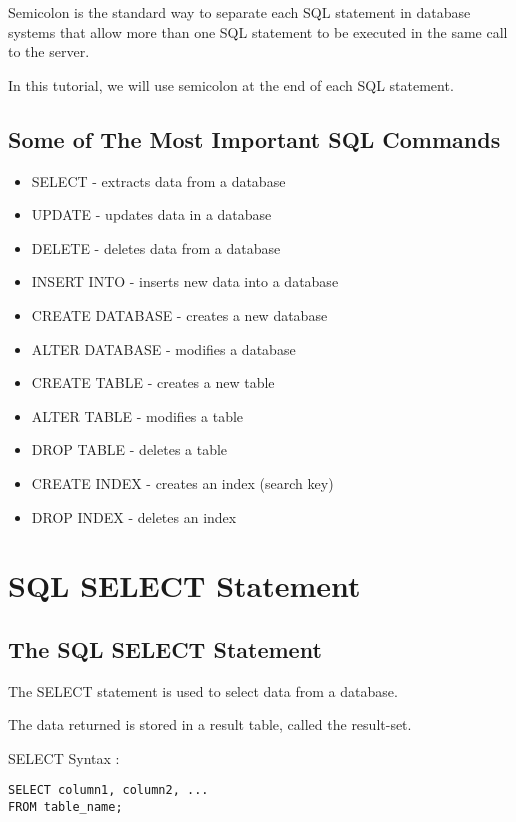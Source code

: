 \documentclass[a4paper,12pt]{article}
\begin{document}
Semicolon is the standard way to separate each SQL statement in database systems that allow more than one SQL statement to be executed in the same call to the server.

In this tutorial, we will use semicolon at the end of each SQL statement.




\subsection{Some of The Most Important SQL Commands}

\begin{itemize}
	\item SELECT - extracts data from a database
	\item UPDATE - updates data in a database
	\item DELETE - deletes data from a database
	\item INSERT INTO - inserts new data into a database
	\item CREATE DATABASE - creates a new database
	\item ALTER DATABASE - modifies a database
	\item CREATE TABLE - creates a new table
	\item ALTER TABLE - modifies a table
	\item DROP TABLE - deletes a table
	\item CREATE INDEX - creates an index (search key)
	\item DROP INDEX - deletes an index
\end{itemize}



\section{SQL SELECT Statement}

\subsection{The SQL SELECT Statement}

The SELECT statement is used to select data from a database.

The data returned is stored in a result table, called the result-set.

SELECT Syntax :

\begin{lstlisting}
SELECT column1, column2, ...
FROM table_name;
\end{lstlisting}
\end{document}
